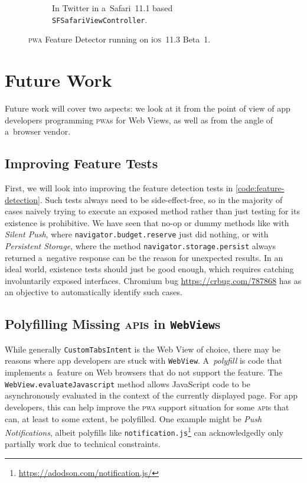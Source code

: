 \documentclass[sigconf]{acmart}
\begin{document}
\begin{figure}[h]
\begin{subfigure}[t]{0.475\columnwidth}
    \caption[\textsc{pwa} Feature Detector running in Twitter.]{
      In Twitter in a~Safari~11.1 based \texttt{SFSafariViewController}.}
    \label{fig:twitter-ios-safari11_1}
  \end{subfigure} 
  \caption{\textsc{pwa} Feature Detector running on i\textsc{os}~11.3 Beta~1.}       
\end{figure}

\section{Future Work}
\label{sec:future-work}

Future work will cover two aspects:
we look at it from the point of view of app developers
programming \textsc{pwa}s for Web Views,
as well as from the angle of a~browser vendor.

\subsection{Improving Feature Tests}

First, we will look into improving the feature detection tests in
\autoref{code:feature-detection}.
Such tests always need to be side-effect-free,
so in the majority of cases naively trying to execute an exposed method
rather than just testing for its existence is prohibitive.
We have seen that no-op or dummy methods like with \emph{Silent Push},
where \texttt{navigator.budget.reserve} just did nothing,
or with \emph{Persistent Storage}, 
where the method \texttt{navigator.storage.persist} always returned a~negative response
can be the reason for unexpected results.
In an ideal world, existence tests should just be good enough,
which requires catching involuntarily exposed interfaces.
Chromium bug \url{https://crbug.com/787868} has as an objective
to automatically identify such cases.

\subsection{Polyfilling Missing \textsc{api}s in \texttt{WebView}s}

While generally \texttt{CustomTabsIntent} is the Web View of choice,
there may be reasons where app developers are stuck with \texttt{WebView}.
A~\emph{polyfill} is code that implements a~feature on Web browsers
that do not support the feature.
The \texttt{WebView.evaluateJavascript} method allows JavaScript code to be 
asynchronously evaluated in the context of the currently displayed page.
For app developers, this can help improve
the \textsc{pwa} support situation for some \textsc{api}s
that can, at least to some extent, be polyfilled.
One example might be \emph{Push Notifications},
albeit polyfills like \texttt{notification.js}\footnote{\url{https://adodson.com/notification.js/}} 
can acknowledgedly only partially work due to technical constraints.
\end{document}

